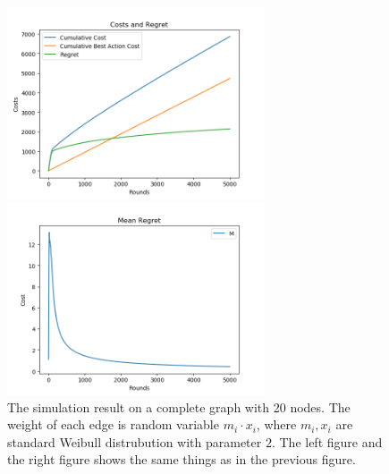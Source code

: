 \documentclass{article}
\theoremstyle{plain}
\theoremstyle{definition}
\theoremstyle{remark}
\begin{document}
    \begin{figure}[htbp!]
        \begin{minipage}[h]{0.5\linewidth}
            \centering
            \includegraphics[width=3in]{simple-cost-regret-weibull2-new.png}
        \end{minipage}
        \begin{minipage}[h]{0.5\linewidth}
            \centering
            \includegraphics[width=3in]{simple-mean-regret-weibull2-new.png}
        \end{minipage}
        \caption{The simulation result on a complete graph with 20 nodes. The weight of each edge is random variable $m_i \cdot x_i$, where $m_i,x_i$ are standard Weibull distrubution with parameter $2$. The left figure and the right figure shows the same things as in the previous figure.}
        \label{center-weibull2}
    \end{figure}
\end{document}
